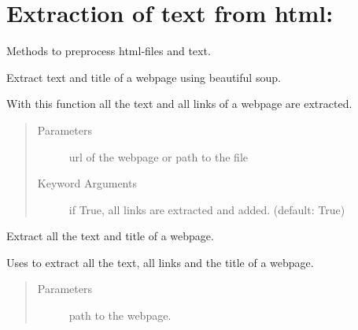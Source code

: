 \documentclass[letterpaper,10pt,english]{sphinxmanual}
\begin{document}
\section{Extraction of text from html:}
\label{\detokenize{api:extraction-of-text-from-html}}\label{\detokenize{api:module-preprocess}}

\begin{fulllineitems}
\label{\detokenize{api:preprocess.Preprocessor}}
Methods to preprocess html-files and text.

\begin{fulllineitems}
\label{\detokenize{api:preprocess.Preprocessor.beautiful_soup}}
Extract text and title of a webpage using beautiful soup.

With this function all the text and all links of a webpage are
extracted.
\begin{quote}\begin{description}
\item[{Parameters}] \leavevmode
{} \textendash{} url of the webpage or path to the file

\item[{Keyword Arguments}] \leavevmode
{} \textendash{} if True, all links are extracted and added. (default: True)

\end{description}\end{quote}

\end{fulllineitems}


\begin{fulllineitems}
\label{\detokenize{api:preprocess.Preprocessor.preprocess_file}}
Extract all the text and title of a webpage.

Uses {\hyperref[\detokenize{api:preprocess.Preprocessor.beautiful_soup}]{}} to extract all the text, all links and
the title of a webpage.
\begin{quote}\begin{description}
\item[{Parameters}] \leavevmode
{} \textendash{} path to the webpage.


\end{description}
\end{quote}
\end{fulllineitems}
\end{fulllineitems}
\end{document}
